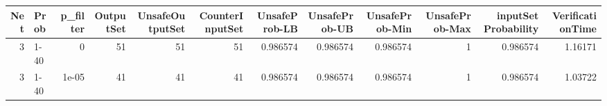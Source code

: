 \begin{tabular}{rlrrrrrrrrrr}
\hline
   Net & Prob   &   p\_filter &   OutputSet &   UnsafeOutputSet &   CounterInputSet &   UnsafeProb-LB &   UnsafeProb-UB &   UnsafeProb-Min &   UnsafeProb-Max &   inputSet Probability &   VerificationTime \\
\hline
     3 & 1-40   &      0     &          51 &                51 &                51 &        0.986574 &        0.986574 &         0.986574 &                1 &               0.986574 &            1.16171 \\
     3 & 1-40   &      1e-05 &          41 &                41 &                41 &        0.986574 &        0.986574 &         0.986574 &                1 &               0.986574 &            1.03722 \\
\hline
\end{tabular}
